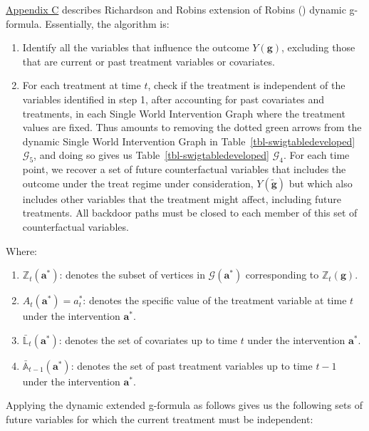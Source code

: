 \documentclass[
  single column]{article}
\providecommand{\tightlist}{%
  \setlength{\itemsep}{0pt}\setlength{\parskip}{0pt}}\usepackage{longtable,booktabs,array}
\begin{document}
\hyperref[id-app-c]{Appendix C} describes Richardson and Robins
extension of Robins () dynamic g-formula.
Essentially, the algorithm is:

\begin{enumerate}
\def\labelenumi{\arabic{enumi}.}
\item
  Identify all the variables that influence the outcome
  \(Y(\mathbf{g})\), excluding those that are current or past treatment
  variables or covariates.
\item
  For each treatment at time \(t\), check if the treatment is
  independent of the variables identified in step 1, after accounting
  for past covariates and treatments, in each Single World Intervention
  Graph where the treatment values are fixed. Thus amounts to removing
  the dotted green arrows from the dynamic Single World Intervention
  Graph in Table~\ref{tbl-swigtabledeveloped} \(\mathcal{G}_5\), and
  doing so gives us Table~\ref{tbl-swigtabledeveloped}
  \(\mathcal{G}_4\). For each time point, we recover a set of future
  counterfactual variables that includes the outcome under the treat
  regime under consideration, \(Y(\mathbf{\tilde{g}})\) but which also
  includes other variables that the treatment might affect, including
  future treatments. All backdoor paths must be closed to each member of
  this set of counterfactual variables.
\end{enumerate}

Where:

\begin{enumerate}
\def\labelenumi{\arabic{enumi}.}
\tightlist
\item
  \textbf{\(\mathbb{Z}_t(\mathbf{a}^*)\)}: denotes the subset of
  vertices in \(\mathcal{G}(\mathbf{a}^*)\) corresponding to
  \(\mathbb{Z}_t(\mathbf{g})\).
\item
  \textbf{\(A_t(\mathbf{a}^*) = a^*_t\)}: denotes the specific value of
  the treatment variable at time \(t\) under the intervention
  \(\mathbf{a}^*\).
\item
  \textbf{\(\bar{\mathbb{L}}_t(\mathbf{a}^*)\)}: denotes the set of
  covariates up to time \(t\) under the intervention \(\mathbf{a}^*\).
\item
  \textbf{\(\bar{\mathbb{A}}_{t-1}(\mathbf{a}^*)\)}: denotes the set of
  past treatment variables up to time \(t-1\) under the intervention
  \(\mathbf{a}^*\).
\end{enumerate}

Applying the dynamic extended g-formula as follows gives us the
following sets of future variables for which the current treatment must
be independent:
\end{document}
